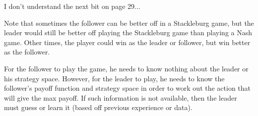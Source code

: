 I don't understand the next bit on page 29...


Note that sometimes the follower can be better off in a Stackleburg game, but
the leader would still be better off playing the Stackleburg game than playing a
Nash game. Other times, the player could win as the leader or follower, but win
better as the follower.

For the follower to play the game, he needs to know nothing about the leader or
his strategy space. However, for the leader to play, he needs to know the
follower's payoff function and strategy space in order to work out the action
that will give the max payoff. If such information is not available, then the
leader must guess or learn it (based off previous experience or data).
